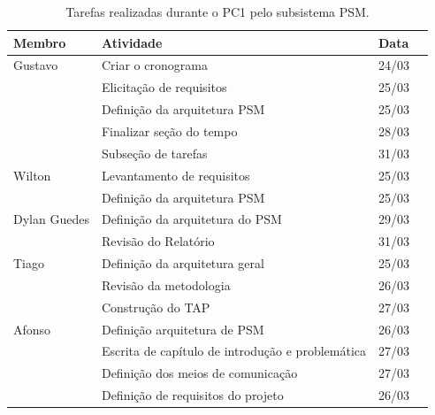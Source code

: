 \begin{table}[h]
  \begin{center}
  \caption{\label{tarefas}Tarefas realizadas durante o PC1 pelo subsistema PSM.}
  \begin{tabular}{|l|l|l|l|}
  \hline
  \textbf{Membro} & \textbf{Atividade} & \textbf{Data} \\ \hline\hline
  Gustavo & Criar o cronograma & 24/03 \\ \hline
   & Elicitação de requisitos & 25/03 \\ \hline
   & Definição da arquitetura PSM & 25/03 \\ \hline
   & Finalizar seção do tempo & 28/03 \\ \hline
   & Subseção de tarefas & 31/03\\ \hline
  Wilton & Levantamento de requisitos & 25/03 \\ \hline
   & Definição da arquitetura PSM & 25/03 \\ \hline
  Dylan Guedes & Definição da arquitetura do PSM & 29/03\\ \hline
   & Revisão do Relatório & 31/03 \\ \hline
  Tiago & Definição da arquitetura geral & 25/03 \\ \hline
   & Revisão da metodologia & 26/03 \\ \hline
   & Construção do TAP & 27/03 \\ \hline
  Afonso & Definição arquitetura de PSM & 26/03 \\ \hline
   & Escrita de capítulo de introdução e problemática & 27/03 \\ \hline
   & Definição dos meios de comunicação & 27/03 \\ \hline
   & Definição de requisitos do projeto & 26/03 \\ \hline
  \end{tabular}
  \end{center}
\end{table}

